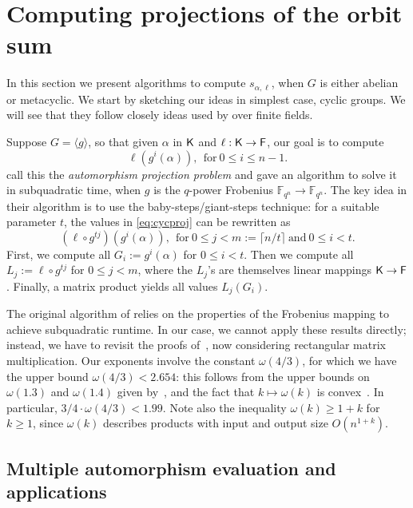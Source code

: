 \section{Computing projections of the orbit sum}
\label{sec:osum}

In this section we present algorithms to compute $s_{\alpha,\ell}$,
when $G$ is either abelian or metacyclic. We start by sketching our
ideas in simplest case, cyclic groups.  We will see that they follow
closely ideas used by \cite{KalSho98} over finite fields.

Suppose $G = \langle g \rangle$, so that given $\alpha$ in ${\mathsf{K}}$ and
$\ell: {\mathsf{K}} \to {\mathsf{F}}$, our goal is to compute
\begin{equation}
  \label{eq:cycproj}
  \ell(g^i(\alpha)), ~~\mbox{for}~ 0\leq i\leq n-1.
\end{equation}
\cite{KalSho98} call this the \emph{automorphism projection problem} and
gave an algorithm to solve it in subquadratic time, when $g$ is the
$q$-power Frobenius $\mathbb{F}_{q^n} \to \mathbb{F}_{q^n}$.  The key idea in their
algorithm is to use the baby-steps/giant-steps technique: for a suitable
parameter $t$, the values in \eqref{eq:cycproj} can be rewritten as
\[
  (\ell \circ g^{tj})(g^i(\alpha)), ~~\mbox{for}~ 0 \leq j < m:=\lceil n/t
  \rceil ~\mbox{and}~ 0 \leq i <t.
\]
First, we compute all $G_i:=g^i(\alpha)$ for $0 \leq i <t$.  Then we compute
all $L_j:=\ell \circ g^{tj}$ for $0 \leq j <m$, where the $L_j$'s are
themselves linear mappings ${\mathsf{K}} \to {\mathsf{F}}$.  Finally, a matrix product yields
all values $L_j(G_i)$.

The original algorithm of \cite{KalSho98} relies on the properties of
the Frobenius mapping to achieve subquadratic runtime. In our case, we
cannot apply these results directly; instead, we have to revisit the
proofs of~\cite[Lemmata 3 and 4]{KalSho98}, now considering
rectangular matrix multiplication.  Our exponents involve the constant
$\omega(4/3)$, for which we have the upper bound $\omega(4/3) <
2.654$: this follows from the upper bounds on $\omega(1.3)$ and
$\omega(1.4)$ given by~\cite{LeGall}, and the fact that $k \mapsto
\omega(k)$ is convex~\citep{LoRo83}. In particular, $3/4 \cdot
\omega(4/3) < 1.99$. Note also the inequality $\omega(k) \ge 1+k$ for
$k\ge 1$, since $\omega(k)$ describes products with input and output
size $O(n^{1+k})$.


\subsection{Multiple automorphism evaluation and applications}

